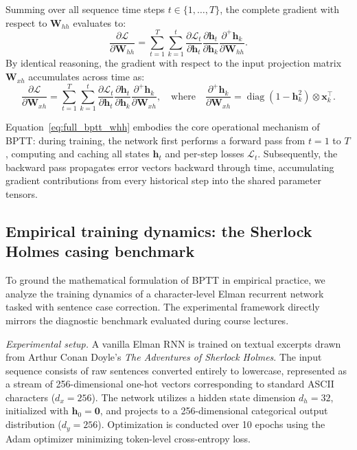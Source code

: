 \documentclass[../../main.tex]{subfiles}
\begin{document}
Summing over all sequence time steps $t \in \{1, \dots, T\}$, the complete gradient with respect to $\mathbf{W}_{hh}$ evaluates to:
\begin{equation}
\frac{\partial \mathcal{L}}{\partial \mathbf{W}_{hh}} = \sum_{t=1}^T \sum_{k=1}^t \frac{\partial \mathcal{L}_t}{\partial \mathbf{h}_t} \frac{\partial \mathbf{h}_t}{\partial \mathbf{h}_k} \frac{\partial^+ \mathbf{h}_k}{\partial \mathbf{W}_{hh}}.
\label{eq:full_bptt_whh}
\end{equation}
By identical reasoning, the gradient with respect to the input projection matrix $\mathbf{W}_{xh}$ accumulates across time as:
\begin{equation}
\frac{\partial \mathcal{L}}{\partial \mathbf{W}_{xh}} = \sum_{t=1}^T \sum_{k=1}^t \frac{\partial \mathcal{L}_t}{\partial \mathbf{h}_t} \frac{\partial \mathbf{h}_t}{\partial \mathbf{h}_k} \frac{\partial^+ \mathbf{h}_k}{\partial \mathbf{W}_{xh}}, \quad \text{where} \quad \frac{\partial^+ \mathbf{h}_k}{\partial \mathbf{W}_{xh}} = \operatorname{diag}\left(1 - \mathbf{h}_k^2\right) \otimes \mathbf{x}_k^\top.
\label{eq:full_bptt_wxh}
\end{equation}

Equation~\ref{eq:full_bptt_whh} embodies the core operational mechanism of BPTT: during training, the network first performs a forward pass from $t=1$ to $T$, computing and caching all states $\mathbf{h}_t$ and per-step losses $\mathcal{L}_t$. Subsequently, the backward pass propagates error vectors backward through time, accumulating gradient contributions from every historical step into the shared parameter tensors.

\subsection{Empirical training dynamics: the Sherlock Holmes casing benchmark}
\label{subsec:rnn_sherlock_holmes_casing}

To ground the mathematical formulation of BPTT in empirical practice, we analyze the training dynamics of a character-level Elman recurrent network tasked with sentence case correction. The experimental framework directly mirrors the diagnostic benchmark evaluated during course lectures.

\textit{Experimental setup.} A vanilla Elman RNN is trained on textual excerpts drawn from Arthur Conan Doyle's \textit{The Adventures of Sherlock Holmes}. The input sequence consists of raw sentences converted entirely to lowercase, represented as a stream of 256-dimensional one-hot vectors corresponding to standard ASCII characters ($d_x = 256$). The network utilizes a hidden state dimension $d_h = 32$, initialized with $\mathbf{h}_0 = \mathbf{0}$, and projects to a 256-dimensional categorical output distribution ($d_y = 256$). Optimization is conducted over 10 epochs using the Adam optimizer \citep{kingma2014adam} minimizing token-level cross-entropy loss.
\end{document}
